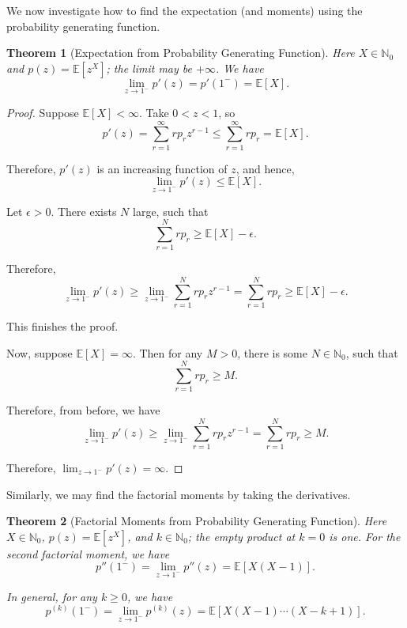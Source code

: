 \documentclass[11pt]{article}
\numberwithin{equation}{section}
\newtheorem{theorem}{Theorem}[section]
\theoremstyle{definition}
\theoremstyle{remark}
\newcommand{\pqty}[1]{\left(#1\right)}
\newcommand{\bqty}[1]{\left[#1\right]}
\newcommand{\NN}{\mathbb N}
\newcommand{\Expt}{\mathbb E}
\begin{document}
We now investigate how to find the expectation (and moments) using the probability generating function.

\begin{theorem}[Expectation from Probability Generating Function]\label{probability-theorem-012}
    \label{probability-thm:expt-pgf}
Here \(X\in\NN_0\) and \(p(z)=\Expt[z^X]\); the limit may be \(+\infty\).
%
    We have
    \[
        \lim_{z \to 1^{-}} p'\pqty{z} = p'\pqty{1^{-}} = \Expt\bqty{X}.
    \]
\end{theorem}

\begin{proof}\label{probability-proof-042}
    Suppose \(\Expt\bqty{X} < \infty\). Take \(0 < z < 1\), so
    \[
        p'\pqty{z} = \sum_{r = 1}^{\infty} r p_r z^{r - 1} \leq \sum_{r = 1}^{\infty} r p_r = \Expt\bqty{X}.
    \]

    Therefore, \(p'\pqty{z}\) is an increasing function of \(z\), and hence,
    \[
        \lim_{z \to 1^{-}} p'\pqty{z} \leq \Expt\bqty{X}.
    \]

    Let \(\epsilon > 0\). There exists \(N\) large, such that
    \[
        \sum_{r = 1}^{N} r p_r \geq \Expt\bqty{X} - \epsilon.
    \]

    Therefore,
    \[
        \lim_{z \to 1^{-}} p'\pqty{z} \geq \lim_{z \to 1^{-}} \sum_{r = 1}^{N} r p_r z^{r - 1} = \sum_{r = 1}^{N} r p_r \geq \Expt\bqty{X} - \epsilon.
    \]

    This finishes the proof.

    Now, suppose \(\Expt\bqty{X} = \infty\). Then for any \(M > 0\), there is some \(N \in \NN_0\), such that
    \[
        \sum_{r = 1}^{N} r p_r \geq M.
    \]

    Therefore, from before, we have
    \[
        \lim_{z \to 1^{-}} p'\pqty{z} \geq \lim_{z \to 1^{-}} \sum_{r = 1}^{N} r p_r z^{r - 1} = \sum_{r = 1}^{N} r p_r \geq M.
    \]

    Therefore, \(\lim_{z \to 1^{-}} p'\pqty{z} = \infty\).
\end{proof}

Similarly, we may find the factorial moments by taking the derivatives.

\begin{theorem}[Factorial Moments from Probability Generating Function]\label{probability-theorem-013}
    \label{probability-thm:factorial-moments-pgf}
Here \(X\in\NN_0\), \(p(z)=\Expt[z^X]\), and \(k\in\NN_0\); the empty product at \(k=0\) is one.
%
    For the second factorial moment, we have
    \[
        p''\pqty{1^-} = \lim_{z \to 1^-} p''\pqty{z} = \Expt\bqty{X \pqty{X - 1}}.
    \]

    In general, for any \(k \geq 0\), we have
    \[
        p^{\pqty{k}} \pqty{1^-} = \lim_{z \to 1^-} p^{\pqty{k}}\pqty{z} = \Expt\bqty{X \pqty{X - 1} \cdots \pqty{X - k + 1}}.
    \]
\end{theorem}
\end{document}
